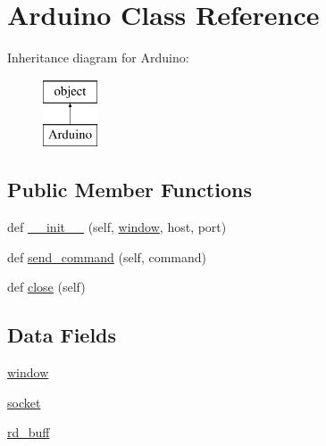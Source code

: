 \hypertarget{class_projekt_01_snake_01auf_01_python_1_1_arduino}{}\section{Arduino Class Reference}
\label{class_projekt_01_snake_01auf_01_python_1_1_arduino}
Inheritance diagram for Arduino\+:\begin{figure}[H]
\begin{center}
\leavevmode
\includegraphics[height=2.000000cm]{class_projekt_01_snake_01auf_01_python_1_1_arduino}
\end{center}
\end{figure}
\subsection*{Public Member Functions}
\begin{DoxyCompactItemize}
\item 
def \mbox{\hyperlink{class_projekt_01_snake_01auf_01_python_1_1_arduino_a3fa102a2756b367e66a90d9f678cd250}{\+\_\+\+\_\+init\+\_\+\+\_\+}} (self, \mbox{\hyperlink{class_projekt_01_snake_01auf_01_python_1_1_arduino_a04a8a2bbfa9c15500892b8e5033d625b}{window}}, host, port)
\item 
def \mbox{\hyperlink{class_projekt_01_snake_01auf_01_python_1_1_arduino_a05097bd2ea4ca3b2c17d7b7164a67539}{send\+\_\+command}} (self, command)
\item 
def \mbox{\hyperlink{class_projekt_01_snake_01auf_01_python_1_1_arduino_a8639372c33e15084a7f7c4d9d87b7bfe}{close}} (self)
\end{DoxyCompactItemize}
\subsection*{Data Fields}
\begin{DoxyCompactItemize}
\item 
\mbox{\hyperlink{class_projekt_01_snake_01auf_01_python_1_1_arduino_a04a8a2bbfa9c15500892b8e5033d625b}{window}}
\item 
\mbox{\hyperlink{class_projekt_01_snake_01auf_01_python_1_1_arduino_a84edc84c8145e7997b70f9919ce44d68}{socket}}
\item 
\mbox{\hyperlink{class_projekt_01_snake_01auf_01_python_1_1_arduino_a1ea8c1aa4f00109a4c17150885fd08c8}{rd\+\_\+buff}}
\end{DoxyCompactItemize}



